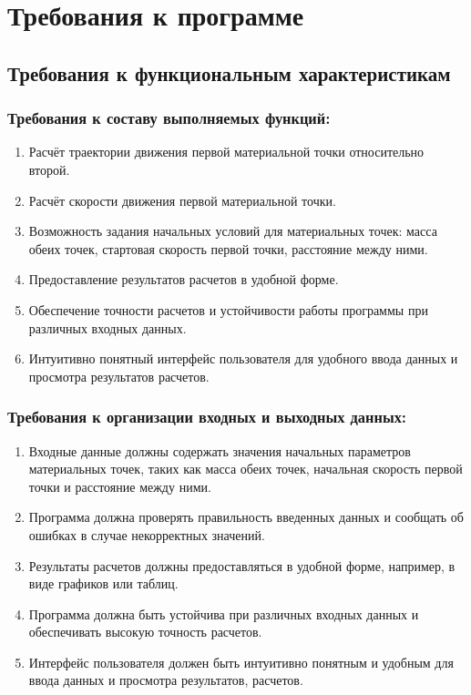  \section{Требования к программе}
 \subsection{Требования к функциональным характеристикам}

 \subsubsection{Требования к составу выполняемых функций:}

 \begin{enumerate}
  \item Расчёт траектории движения первой материальной точки относительно второй.
  \item Расчёт скорости движения первой материальной точки.
  \item Возможность задания начальных условий для материальных точек: масса обеих точек, стартовая скорость первой точки, расстояние между ними.
  \item Предоставление результатов расчетов в удобной форме.
  \item Обеспечение точности расчетов и устойчивости работы программы при различных входных данных.
  \item Интуитивно понятный интерфейс пользователя для удобного ввода данных и просмотра результатов расчетов.
 \end{enumerate}

 \subsubsection{Требования к организации входных и выходных данных:}

 \begin{enumerate}
  \item Входные данные должны содержать значения начальных параметров материальных точек, таких как масса обеих точек, начальная скорость первой точки и расстояние между ними.
  \item Программа должна проверять правильность введенных данных и сообщать об ошибках в случае некорректных значений.
  \item Результаты расчетов должны предоставляться в удобной форме, например, в виде графиков или таблиц.
  \item Программа должна быть устойчива при различных входных данных и обеспечивать высокую точность расчетов.
  \item Интерфейс пользователя должен быть интуитивно понятным и удобным для ввода данных и просмотра результатов, расчетов.
 \end{enumerate}

